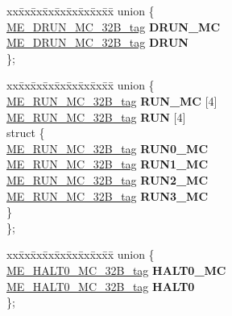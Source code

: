 \begin{DoxyCompactItemize}
\begin{tabbing}
\end{tabbing}\item 
\mbox{\label{structME__struct__tag_a65546fb0a3db6f1be8716f9e2fa7fa34}} 
\begin{tabbing}
xx\=xx\=xx\=xx\=xx\=xx\=xx\=xx\=xx\=\kill
union \{\\
\>\mbox{\hyperlink{unionME__DRUN__MC__32B__tag}{ME\_DRUN\_MC\_32B\_tag}} {\bfseries DRUN\_MC}\\
\>\mbox{\hyperlink{unionME__DRUN__MC__32B__tag}{ME\_DRUN\_MC\_32B\_tag}} {\bfseries DRUN}\\
\}; \\

\end{tabbing}\item 
\mbox{\label{structME__struct__tag_affafb7775ce7e8f1fb5388516de5a344}} 
\begin{tabbing}
xx\=xx\=xx\=xx\=xx\=xx\=xx\=xx\=xx\=\kill
union \{\\
\>\mbox{\hyperlink{unionME__RUN__MC__32B__tag}{ME\_RUN\_MC\_32B\_tag}} {\bfseries RUN\_MC} \mbox{[}4\mbox{]}\\
\>\mbox{\hyperlink{unionME__RUN__MC__32B__tag}{ME\_RUN\_MC\_32B\_tag}} {\bfseries RUN} \mbox{[}4\mbox{]}\\
\mbox{\label{unionME__struct__tag_1_1_0D1627_ae9bc749607b1baed867cf039f4dcd372}} 
\>struct \{\\
\>\>\mbox{\hyperlink{unionME__RUN__MC__32B__tag}{ME\_RUN\_MC\_32B\_tag}} {\bfseries RUN0\_MC}\\
\>\>\mbox{\hyperlink{unionME__RUN__MC__32B__tag}{ME\_RUN\_MC\_32B\_tag}} {\bfseries RUN1\_MC}\\
\>\>\mbox{\hyperlink{unionME__RUN__MC__32B__tag}{ME\_RUN\_MC\_32B\_tag}} {\bfseries RUN2\_MC}\\
\>\>\mbox{\hyperlink{unionME__RUN__MC__32B__tag}{ME\_RUN\_MC\_32B\_tag}} {\bfseries RUN3\_MC}\\
\>\} \\
\}; \\

\end{tabbing}\item 
\mbox{\label{structME__struct__tag_a6414af373871ea55e44ec956ce3249c8}} 
\begin{tabbing}
xx\=xx\=xx\=xx\=xx\=xx\=xx\=xx\=xx\=\kill
union \{\\
\>\mbox{\hyperlink{unionME__HALT0__MC__32B__tag}{ME\_HALT0\_MC\_32B\_tag}} {\bfseries HALT0\_MC}\\
\>\mbox{\hyperlink{unionME__HALT0__MC__32B__tag}{ME\_HALT0\_MC\_32B\_tag}} {\bfseries HALT0}\\
\}; \\


\end{tabbing}
\end{DoxyCompactItemize}
